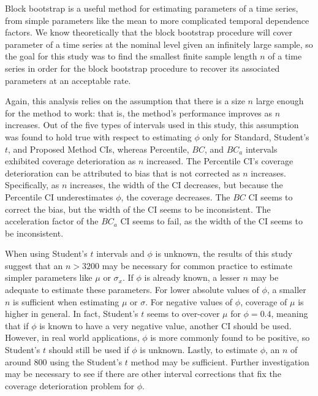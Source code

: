 \documentclass[12pt, letterpaper, titlepage]{article}
\begin{document}
Block bootstrap is a useful method for estimating parameters of a time
series, from simple parameters like the mean to more complicated temporal
 dependence factors.
 We know theoretically that the block bootstrap procedure will cover
  parameter of a time series at the nominal level given an
 infinitely large
sample, so the goal for this study was to find the smallest finite
sample length $n$ of a time series in order for the block bootstrap procedure
to 
recover its associated parameters at an acceptable rate.

Again, this analysis relies on the assumption that
there is a size $n$ large enough for the method to work: that is, the method's
performance improves as $n$ increases. Out of the five types of intervals used
in this study, this assumption was found to hold true with respect to
estimating $\phi$ only for Standard, Student's $t$, and Proposed Method CIs, 
whereas Percentile, 
$BC$, and $BC_a$ intervals exhibited coverage deterioration as $n$
increased. The Percentile CI's coverage deterioration can be attributed to
bias that is not corrected as $n$ increases. Specifically, as $n$ increases, 
the width of the CI decreases, but because the Percentile CI
underestimates $\phi$, the coverage decreases. The $BC$ CI seems to correct the 
bias, but the width of the CI seems to be inconsistent. The acceleration 
factor of the $BC_a$ CI seems to fail, as the width of the CI
seems to be inconsistent. 

When using Student's $t$ intervals and $\phi$ is
unknown, the results of this study suggest that an $n > 3200$ may be
necessary for common practice to estimate simpler parameters like $\mu$ 
or $\sigma_x$. If $\phi$ is already known, a lesser $n$ may be adequate
to
estimate these parameters. For lower absolute values of $\phi$, a smaller
$n$ is sufficient when estimating $\mu$ or $\sigma$. For negative
values of $\phi$, coverage of $\mu$ is higher in general. In fact, 
Student's $t$ seems to over-cover $\mu$ for $\phi = 0.4$, 
meaning that if $\phi$ is known to have a very negative value, another CI
should be used.
However, in real world applications, $\phi$ is
more commonly found to be positive, so Student's $t$ should still be used
if $\phi$ is unknown.
Lastly, to estimate $\phi$, an $n$ of around $800$ using the 
Student's $t$ method
 may be sufficient.
Further investigation may be necessary to see if there are other interval
corrections that fix the coverage deterioration problem for $\phi$.
\end{document}
